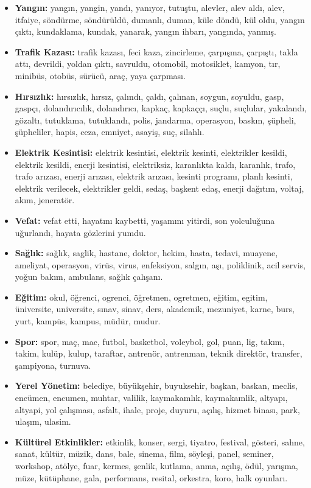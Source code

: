 \documentclass[conference]{IEEEtran}
\begin{document}
\begin{itemize}
    \item \textbf{Yangın:} yangın, yangin, yandı, yanıyor, tutuştu, alevler, alev aldı, alev, itfaiye, söndürme, söndürüldü, dumanlı, duman, küle döndü, kül oldu, yangın çıktı, kundaklama, kundak, yanarak, yangın ihbarı, yangında, yanmış.
    \item \textbf{Trafik Kazası:} trafik kazası, feci kaza, zincirleme, çarpışma, çarpıştı, takla attı, devrildi, yoldan çıktı, savruldu, otomobil, motosiklet, kamyon, tır, minibüs, otobüs, sürücü, araç, yaya çarpması.
    \item \textbf{Hırsızlık:} hırsızlık, hırsız, çalındı, çaldı, çalınan, soygun, soyuldu, gasp, gaspçı, dolandırıcılık, dolandırıcı, kapkaç, kapkaççı, suçlu, suçlular, yakalandı, gözaltı, tutuklama, tutuklandı, polis, jandarma, operasyon, baskın, şüpheli, şüpheliler, hapis, ceza, emniyet, asayiş, suç, silahlı.
    \item \textbf{Elektrik Kesintisi:} elektrik kesintisi, elektrik kesinti, elektrikler kesildi, elektrik kesildi, enerji kesintisi, elektriksiz, karanlıkta kaldı, karanlık, trafo, trafo arızası, enerji arızası, elektrik arızası, kesinti programı, planlı kesinti, elektrik verilecek, elektrikler geldi, sedaş, başkent edaş, enerji dağıtım, voltaj, akım, jeneratör.
    \item \textbf{Vefat:} vefat etti, hayatını kaybetti, yaşamını yitirdi, son yolculuğuna uğurlandı, hayata gözlerini yumdu.
    \item \textbf{Sağlık:} sağlık, saglik, hastane, doktor, hekim, hasta, tedavi, muayene, ameliyat, operasyon, virüs, virus, enfeksiyon, salgın, aşı, poliklinik, acil servis, yoğun bakım, ambulans, sağlık çalışanı.
    \item \textbf{Eğitim:} okul, öğrenci, ogrenci, öğretmen, ogretmen, eğitim, egitim, üniversite, universite, sınav, sinav, ders, akademik, mezuniyet, karne, burs, yurt, kampüs, kampus, müdür, mudur.
    \item \textbf{Spor:} spor, maç, mac, futbol, basketbol, voleybol, gol, puan, lig, takım, takim, kulüp, kulup, taraftar, antrenör, antrenman, teknik direktör, transfer, şampiyona, turnuva.
    \item \textbf{Yerel Yönetim:} belediye, büyükşehir, buyuksehir, başkan, baskan, meclis, encümen, encumen, muhtar, valilik, kaymakamlık, kaymakamlik, altyapı, altyapi, yol çalışması, asfalt, ihale, proje, duyuru, açılış, hizmet binası, park, ulaşım, ulasim.
    \item \textbf{Kültürel Etkinlikler:} etkinlik, konser, sergi, tiyatro, festival, gösteri, sahne, sanat, kültür, müzik, dans, bale, sinema, film, söyleşi, panel, seminer, workshop, atölye, fuar, kermes, şenlik, kutlama, anma, açılış, ödül, yarışma, müze, kütüphane, gala, performans, resital, orkestra, koro, halk oyunları.
\end{itemize}
\end{document}
